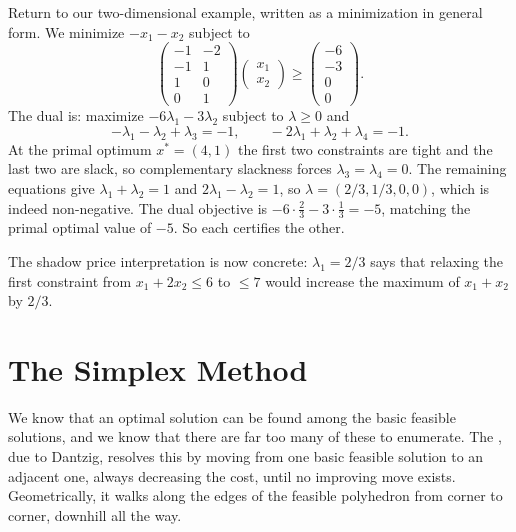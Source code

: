 \documentclass[a4paper]{scrartcl}
\begin{document}
\begin{example}
    Return to our two-dimensional example, written as a minimization in general form. We minimize $-x_1 - x_2$ subject to
    $$
    \begin{pmatrix} -1 & -2 \\ -1 & 1 \\ 1 & 0 \\ 0 & 1\end{pmatrix}\begin{pmatrix}x_1\\x_2\end{pmatrix} \geq \begin{pmatrix}-6\\-3\\0\\0\end{pmatrix}.
    $$
    The dual is: maximize $-6\lambda_1 - 3\lambda_2$ subject to $\lambda \geq 0$ and
    $$
    -\lambda_1 - \lambda_2 + \lambda_3 = -1, \qquad -2\lambda_1 + \lambda_2 + \lambda_4 = -1.
    $$
    At the primal optimum $x^* = (4,1)$ the first two constraints are tight and the last two are slack, so complementary slackness forces $\lambda_3 = \lambda_4 = 0$. The remaining equations give $\lambda_1 + \lambda_2 = 1$ and $2\lambda_1 - \lambda_2 = 1$, so $\lambda = (2/3, 1/3, 0, 0)$, which is indeed non-negative. The dual objective is $-6\cdot\frac23 - 3\cdot\frac13 = -5$, matching the primal optimal value of $-5$. So each certifies the other.

    The shadow price interpretation is now concrete: $\lambda_1 = 2/3$ says that relaxing the first constraint from $x_1 + 2x_2 \leq 6$ to $\leq 7$ would increase the maximum of $x_1 + x_2$ by $2/3$.
\end{example}

\section{The Simplex Method}

We know that an optimal solution can be found among the basic feasible solutions, and we know that there are far too many of these to enumerate. The , due to Dantzig, resolves this by moving from one basic feasible solution to an adjacent one, always decreasing the cost, until no improving move exists. Geometrically, it walks along the edges of the feasible polyhedron from corner to corner, downhill all the way.
\end{document}
